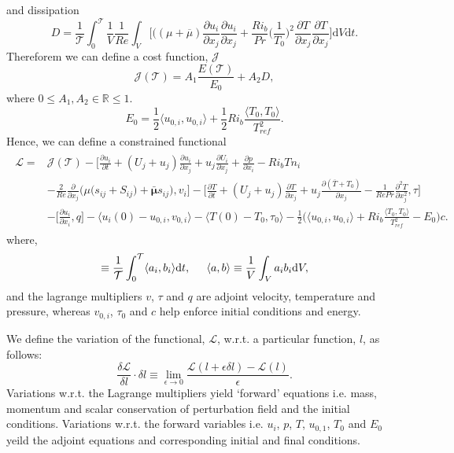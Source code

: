 \documentclass[preprint,12pt]{article}
\begin{document}
and dissipation
\begin{equation}
D=\frac{1}{\mathcal{T}}\int_{0}^{\mathcal{T}}\frac{1}{V}\frac{1}{Re}\int_V\Bigg[\Big((\mu+\overline{\mu})\frac{\partial u_{i}}{\partial x_j}\frac{\partial u_{i}}{\partial x_j}+\frac{Ri_b}{Pr}\Big(\frac{1}{T_0}\Big)^2{\frac{\partial T}{\partial x_j}\frac{\partial T}{\partial x_j}}\Bigg]\text{d}V\text{d}t.
\end{equation}
Thereforem we can define a cost function, $\mathcal{J}$
\begin{equation}
\mathcal{J}(\mathcal{T})=A_1\frac{E(\mathcal{T})}{E_0}+A_2D,
\end{equation}
where $0\le A_1,A_2\in\mathbb{R}\le 1$.
\begin{equation}
E_0=\frac{1}{2}\Big\langle u_{0,i},u_{0,i}\Big\rangle+\frac{1}{2}Ri_b \frac{\langle T_{0},T_{0}\rangle}{T_{ref}^2}.
\end{equation}
Hence, we can define a constrained functional
\begin{align}\begin{split}
\mathcal{L}=&\mathcal{J}(\mathcal{T})-\Bigg[\frac{\partial{u_i}}{\partial{t}}+(U_j+u_j)\frac{\partial u_i}{\partial x_j} +u_j\frac{\partial U_i}{\partial x_j}+\frac{\partial p}{\partial x_i}-{Ri_bT}n_i\\&-{\frac{2}{Re}}{\frac{\partial}{\partial x_j}}\Big({\mu}\big(s_{ij}+S_{ij}\big)+\mathbf{\bar{\mu}}s_{ij}\Big),v_i\Bigg]-\Bigg[\frac{\partial{T}}{\partial{t}}+(U_j+u_j)\frac{\partial T}{\partial x_j} +u_j\frac{\partial(\overline{T}+T_0)}{\partial x_j}-\frac{1}{{Re }Pr} \frac{\partial^2T}{\partial x_j^2},\tau\Bigg]\\&-\Bigg[\frac{\partial u_i}{\partial x_i},q\Bigg]-\langle u_i(0)-u_{0,i},v_{0,i}\rangle-\langle T(0)-T_{0},\tau_{0}\rangle-\frac{1}{2}\Big(\Big\langle u_{0,i},u_{0,i}\Big\rangle+Ri_b \frac{\langle T_{0},T_{0}\rangle}{T_{ref}^2}-E_0\Big)c.
\end{split}\end{align}
where,
\begin{equation}
[a_i,b_i]\equiv\frac{1}{\mathcal{T}}\int_{0}^{\mathcal{T}}\langle a_i,b_i \rangle\text{d}t,\hspace{0.2in}\langle a,b \rangle\equiv \frac{1}{V}\int_Va_ib_i \text{d}V,
\end{equation}
and the lagrange multipliers $v$, $\tau$ and $q$ are adjoint velocity, temperature and pressure, whereas $v_{0,i}$, $\tau_0$ and $c$ help enforce initial conditions and energy.

We define the variation of the functional, $\mathcal{L}$, w.r.t. a particular function, $l$, as follows:
\begin{equation}
\frac{\delta \mathcal{L}}{\delta l}\cdot \delta l\equiv \lim\limits_{\epsilon \rightarrow 0}\frac{\mathcal{L}(l+\epsilon\delta l)-\mathcal{L}(l)}{\epsilon}.
\end{equation}
Variations w.r.t. the Lagrange multipliers yield `forward' equations i.e.  mass, momentum and scalar conservation of perturbation field and the initial conditions. Variations w.r.t. the forward variables i.e. $u_i$, $p$, $T$, $u_{0,1}$, $T_0$ and $E_0$ yeild the adjoint equations and corresponding initial and final conditions.
\end{document}
